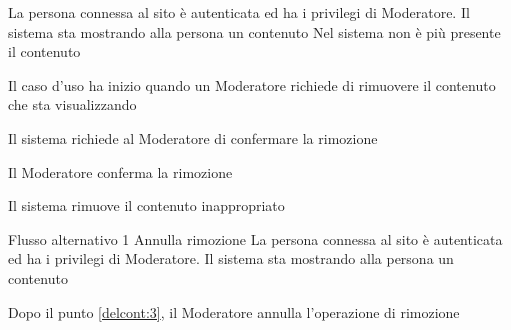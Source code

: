 {}
{La persona connessa al sito è autenticata ed ha i privilegi di Moderatore. Il sistema sta mostrando alla persona un \gls{contenuto}}
{Nel sistema non è più presente il \gls{contenuto}}
{\begin{enumCU}
	\item Il caso d'uso ha inizio quando un Moderatore richiede di rimuovere il \gls{contenuto} che sta visualizzando\label{rim2}
	\item Il sistema richiede al Moderatore di confermare la rimozione\label{delcont:3}
	\item Il Moderatore conferma la rimozione 
	\item Il sistema rimuove il \gls{contenuto} inappropriato
\end{enumCU}}
%
{Flusso alternativo 1}%
{Annulla rimozione}%
{La persona connessa al sito è autenticata ed ha i privilegi di Moderatore. Il sistema sta mostrando alla persona un \gls{contenuto}}
{\postNulle}%
{\begin{enumCU}
		\item Dopo il punto \ref{delcont:3}, il Moderatore annulla l'operazione di rimozione
\end{enumCU}}%


